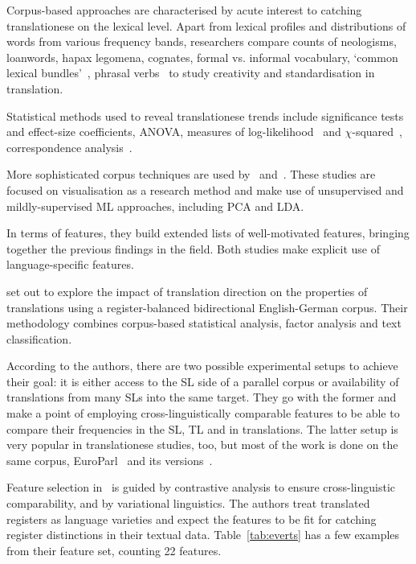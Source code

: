 Corpus-based approaches are characterised by acute interest to catching translationese on the lexical level. Apart from lexical profiles and distributions of words from various frequency bands, researchers compare counts of neologisms, loanwords, hapax legomena, cognates, formal vs. informal vocabulary, `common lexical bundles'~\cite{Kruger2010}, phrasal verbs~\cite{Cappelle2017} to study creativity and standardisation in translation.

Statistical methods used to reveal translationese trends include significance tests and effect-size coefficients, \gls{ANOVA}, measures of log-likelihood~\cite{Xiao2010} and $\chi$-squared~\cite{Cappelle2017}, correspondence analysis~\cite{Delaere2012}.

More sophisticated corpus techniques are used by~\citet{Sutter2017} and~\citet{Evert2017}. These studies are focused on visualisation as a research method and make use of unsupervised and mildly-supervised ML approaches, including \gls{PCA} and \gls{LDA}.

In terms of features, they build extended lists of well-motivated features, bringing together the previous findings in the field. Both studies make explicit use of language-specific features. 

\citet{Evert2017} set out to explore the impact of translation direction on the properties of translations using a register-balanced bidirectional English-German corpus. Their methodology combines corpus-based statistical analysis, factor analysis and text classification.

According to the authors, there are two possible experimental setups to achieve their goal: it is either access to the SL side of a parallel corpus or availability of translations from many SLs into the same target. They go with the former and make a point of employing cross-linguistically comparable features to be able to compare their frequencies in the SL, TL and in translations. 
The latter setup is very popular in translationese studies, too, but most of the work is done on the same corpus, EuroParl~\cite{Koehn2005} and its versions~\cite[to name just a few]{VanHalteren2008,Koppel2011,Carter2012,Volansky2012,Lembersky2013,Rabinovich2017}.

Feature selection in~\citet{Evert2017} is guided by contrastive analysis to ensure cross-linguistic comparability, and by variational linguistics. The authors treat translated registers as language varieties and expect the features to be fit for catching register distinctions in their textual data. Table~\ref{tab:everts} has a few examples from their feature set, counting 22 features.

